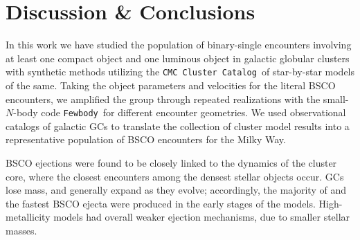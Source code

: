 \documentclass[twocolumn]{aastex631}
\newcommand{\kms}{${\rm km \times s^{-1}}$}
\newcommand{\CMCcat}{\texttt{CMC Cluster Catalog}}
\newcommand{\fewbody}{\texttt{Fewbody}}
\begin{document}
%

\section{Discussion \& Conclusions} \label{sec:disccon}

In this work we have studied the population of binary-single encounters involving at least one compact object and one luminous object in galactic globular clusters with synthetic methods utilizing the \CMCcat\ of star-by-star models of the same.
Taking the object parameters and velocities for the literal BSCO encounters, we amplified the group through repeated realizations with the small-$N$-body code \fewbody\ for different encounter geometries.
We used observational catalogs of galactic GCs to translate the collection of cluster model results into a representative population of BSCO encounters for the Milky Way.

BSCO ejections were found to be closely linked to the dynamics of the cluster core, where the closest encounters among the densest stellar objects occur.
GCs lose mass, and generally expand as they evolve; accordingly, the majority of and the fastest BSCO ejecta were produced in the early stages of the models.
High-metallicity models had overall weaker ejection mechanisms, due to smaller stellar masses.

\end{document}
